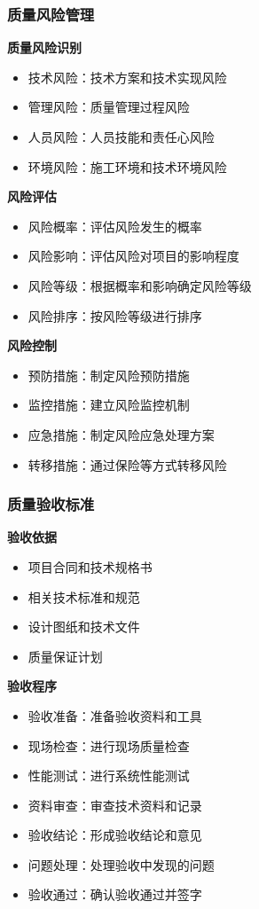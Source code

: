 \documentclass[UTF8,a4paper,zihao=-4]{ctexart}
\begin{document}
\subsubsection{质量风险管理}
\textbf{质量风险识别}
\begin{itemize}
    \item 技术风险：技术方案和技术实现风险
    \item 管理风险：质量管理过程风险
    \item 人员风险：人员技能和责任心风险
    \item 环境风险：施工环境和技术环境风险
\end{itemize}

\textbf{风险评估}
\begin{itemize}
    \item 风险概率：评估风险发生的概率
    \item 风险影响：评估风险对项目的影响程度
    \item 风险等级：根据概率和影响确定风险等级
    \item 风险排序：按风险等级进行排序
\end{itemize}

\textbf{风险控制}
\begin{itemize}
    \item 预防措施：制定风险预防措施
    \item 监控措施：建立风险监控机制
    \item 应急措施：制定风险应急处理方案
    \item 转移措施：通过保险等方式转移风险
\end{itemize}

\subsubsection{质量验收标准}
\textbf{验收依据}
\begin{itemize}
    \item 项目合同和技术规格书
    \item 相关技术标准和规范
    \item 设计图纸和技术文件
    \item 质量保证计划
\end{itemize}

\textbf{验收程序}
\begin{itemize}
    \item 验收准备：准备验收资料和工具
    \item 现场检查：进行现场质量检查
    \item 性能测试：进行系统性能测试
    \item 资料审查：审查技术资料和记录
    \item 验收结论：形成验收结论和意见
    \item 问题处理：处理验收中发现的问题
    \item 验收通过：确认验收通过并签字
\end{itemize}
\end{document}
